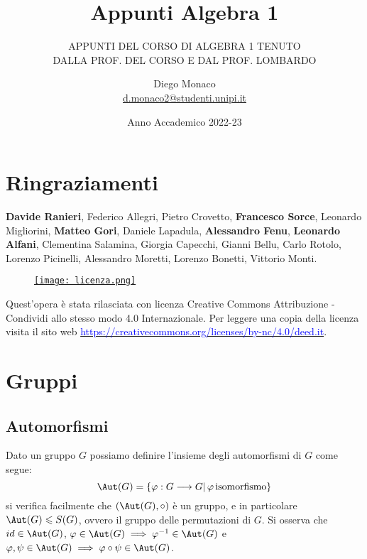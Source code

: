 \documentclass[11pt]{scrartcl}
\begin{document}
\title{Appunti Algebra 1}
\subtitle{\large\normalfont\rmfamily\scshape APPUNTI DEL CORSO DI ALGEBRA 1 TENUTO\\ DALLA PROF. DEL CORSO E DAL PROF. LOMBARDO}
\author{Diego Monaco \\ \textnormal{\href{d.monaco2@studenti.unipi.it}{d.monaco2@studenti.unipi.it}}}
\date{Anno Accademico 2022-23}
\maketitle
\newpage

\tableofcontents
\eject
\newpage

\section*{Ringraziamenti}
\textbf{Davide Ranieri}, Federico Allegri, Pietro Crovetto, \textbf{Francesco Sorce}, Leonardo Migliorini, \textbf{Matteo Gori}, Daniele Lapadula, \textbf{Alessandro Fenu},
\textbf{Leonardo Alfani}, Clementina Salamina, Giorgia Capecchi, Gianni Bellu, Carlo Rotolo, Lorenzo Picinelli, Alessandro Moretti, Lorenzo Bonetti, Vittorio Monti.
\mbox{}
\vfill
\begin{wrapfigure}{R}{0.2\textwidth}
	\centering
	\href{https://creativecommons.org/licenses/by-nc/4.0/deed.it}{\texttt{[image: licenza.png]}}
\end{wrapfigure}

Quest'opera è stata rilasciata con licenza Creative Commons Attribuzione - Condividi allo stesso modo 4.0 Internazionale. Per leggere
una copia della licenza visita il sito web \href{http://creativecommons.org/licenses/by-sa/4.0/deed.it}{\textcolor{blue}{https://creativecommons.org/licenses/by-nc/4.0/deed.it}}.\\

\newpage
\section{Gruppi}
\subsection{Automorfismi}
Dato un gruppo $G$ possiamo definire l'insieme degli automorfismi di $G$ come segue:
    \[ \Aut(G) = \{\varphi : G \longrightarrow G |\, \varphi \, \text{isomorfismo}\}
        \]
si verifica facilmente che $(\Aut(G), \circ)$ è un gruppo, e in particolare $\Aut(G) \leqslant S(G)$,
ovvero il gruppo delle permutazioni di $G$. Si osserva che $id \in \Aut(G)$, $\varphi \in \Aut(G) \implies 
\varphi^{-1} \in \Aut(G)$ e $\varphi,\psi \in \Aut(G) \implies \varphi \circ \psi \in \Aut(G)$.
\end{document}
